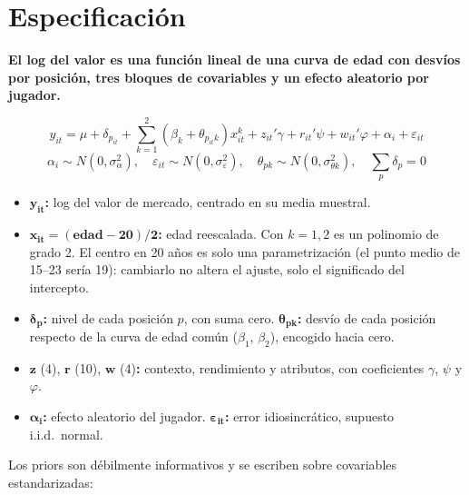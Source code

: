 \documentclass[11pt,a4paper]{article}
\newcommand{\lead}[1]{\textbf{#1}}
\begin{document}
\section{Especificación}

\lead{El log del valor es una función lineal de una curva de edad con desvíos por posición, tres bloques de covariables y un efecto aleatorio por jugador.}

\begin{equation*}
y_{it} = \mu + \delta_{p_{it}} + \sum_{k=1}^{2} \left(\beta_k + \theta_{p_{it}k}\right) x_{it}^{k} + z_{it}'\gamma + r_{it}'\psi + w_{it}'\varphi + \alpha_i + \varepsilon_{it}
\end{equation*}
\begin{equation*}
\alpha_i \sim N(0, \sigma_\alpha^2), \quad \varepsilon_{it} \sim N(0, \sigma_\varepsilon^2), \quad \theta_{pk} \sim N(0, \sigma_{\theta k}^2), \quad \sum_p \delta_p = 0
\end{equation*}

\begin{itemize}
  \item $\boldsymbol{y_{it}}$\textbf{:} log del valor de mercado, centrado en su media muestral.
  \item $\boldsymbol{x_{it}=(\text{edad}-20)/2}$\textbf{:} edad reescalada. Con $k=1,2$ es un polinomio de grado 2. El centro en 20 años es solo una parametrización (el punto medio de 15--23 sería 19): cambiarlo no altera el ajuste, solo el significado del intercepto.
  \item $\boldsymbol{\delta_p}$\textbf{:} nivel de cada posición $p$, con suma cero. $\boldsymbol{\theta_{pk}}$\textbf{:} desvío de cada posición respecto de la curva de edad común ($\beta_1$, $\beta_2$), encogido hacia cero.
  \item $\boldsymbol{z}$ (4), $\boldsymbol{r}$ (10), $\boldsymbol{w}$ (4)\textbf{:} contexto, rendimiento y atributos, con coeficientes $\gamma$, $\psi$ y $\varphi$.
  \item $\boldsymbol{\alpha_i}$\textbf{:} efecto aleatorio del jugador. $\boldsymbol{\varepsilon_{it}}$\textbf{:} error idiosincrático, supuesto i.i.d.\ normal.
\end{itemize}

Los priors son débilmente informativos y se escriben sobre covariables estandarizadas:
\end{document}
